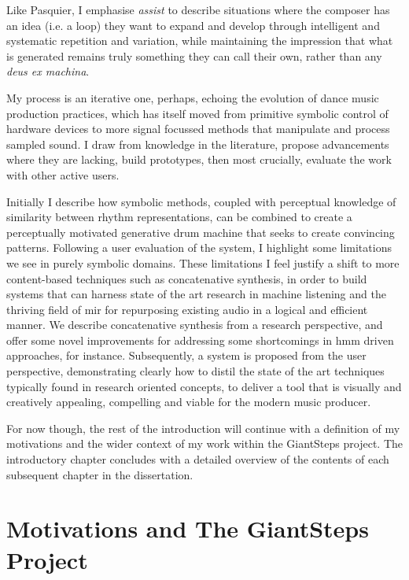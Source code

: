 Like Pasquier, I emphasise \textit{assist} to describe situations where the composer has an idea (i.e. a loop) they want to expand and develop through intelligent and systematic repetition and variation, while maintaining the impression that what is generated remains truly something they can call their own, rather than any \textit{deus ex machina}.

My process is an iterative one, perhaps, echoing the evolution of dance music production practices, which has itself moved from primitive symbolic control of hardware devices to more signal focussed methods that manipulate and process sampled sound. I draw from knowledge in the literature, propose advancements where they are lacking, build prototypes, then most crucially, evaluate the work with other active users. 

Initially I describe how symbolic methods, coupled with perceptual knowledge of similarity between rhythm representations, can be combined to create a perceptually motivated generative drum machine that seeks to create convincing patterns. Following a user evaluation of the system, I highlight some limitations we see in purely symbolic domains. These limitations I feel justify a shift to more content-based techniques such as concatenative synthesis, in order to build systems that can harness state of the art research in machine listening and the thriving field of \acrfull{mir} for repurposing existing audio in a logical and efficient manner. We describe concatenative synthesis from a research perspective, and offer some novel improvements for addressing some shortcomings in \acrfull{hmm} driven approaches, for instance. Subsequently, a system is proposed from the user perspective, demonstrating clearly how to distil the state of the art techniques typically found in research oriented concepts, to deliver a tool that is visually and creatively appealing, compelling and viable for the modern music producer. 

For now though, the rest of the introduction will continue with a definition of my motivations and the wider context of my work within the GiantSteps project. The introductory chapter concludes with a detailed overview of the contents of each subsequent chapter in the dissertation.

\section{Motivations and The GiantSteps Project}


